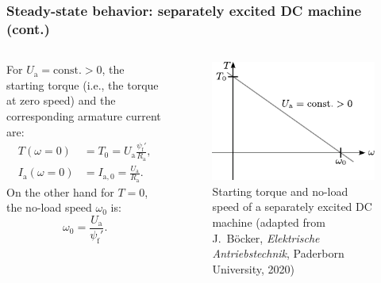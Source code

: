 \begin{frame}
	\frametitle{Steady-state behavior: separately excited DC machine (cont.)}
	\begin{columns}
		\begin{column}{0.55\textwidth}
		For $U_\mathrm{a}=\mbox{const.}>0$, the starting torque (i.e., the torque at zero speed) and the corresponding armature current are:
		\begin{equation}
			\begin{split}
				T(\omega=0) &= T_0 = U_\mathrm{a}\frac{\psi_\mathrm{f}'}{R_\mathrm{a}}, \\ I_\mathrm{a}(\omega=0) &= I_{\mathrm{a},0}=  \frac{U_\mathrm{a}}{R_\mathrm{a}}.
			\end{split}
		\end{equation} \pause
		On the other hand for $T=0$, the no-load speed $\omega_0$ is:
		\begin{equation}
			\omega_0 = \frac{U_\mathrm{a}}{\psi_\mathrm{f}'}.
		\end{equation} \pause
\end{column}
\hfill
\begin{column}{0.45\textwidth}
	\vspace{-0.2cm}
	\begin{figure}
		\centering
		\includegraphics{fig/lec03/Sep_DC_machine_starting_torque.pdf}
		\caption{Starting torque and no-load speed of a separately excited DC machine (adapted from J.~B\"ocker, \textit{Elektrische Antriebstechnik}, Paderborn University, 2020)}
	\end{figure}
\end{column}
\end{columns}		
\end{frame}

